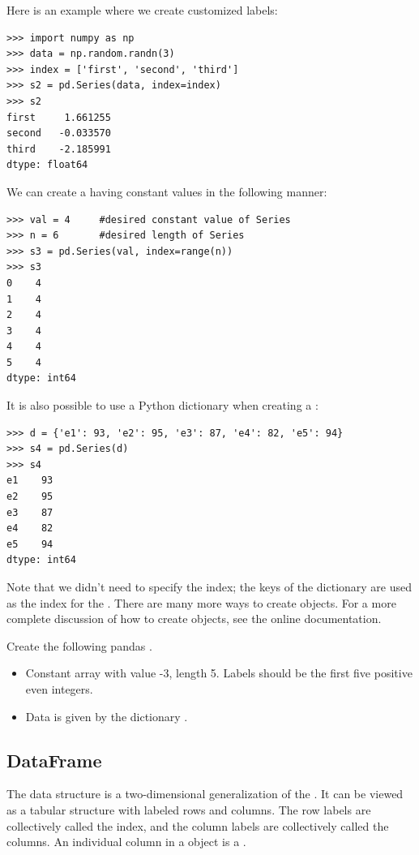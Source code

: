 Here is an example where we create customized labels:
\begin{lstlisting}
>>> import numpy as np
>>> data = np.random.randn(3)
>>> index = ['first', 'second', 'third']
>>> s2 = pd.Series(data, index=index)
>>> s2
first     1.661255
second   -0.033570
third    -2.185991
dtype: float64
\end{lstlisting}

We can create a  having constant values in the following manner:
\begin{lstlisting}
>>> val = 4     #desired constant value of Series
>>> n = 6       #desired length of Series
>>> s3 = pd.Series(val, index=range(n))
>>> s3
0    4
1    4
2    4
3    4
4    4
5    4
dtype: int64
\end{lstlisting}

It is also possible to use a Python dictionary when creating a :
\begin{lstlisting}
>>> d = {'e1': 93, 'e2': 95, 'e3': 87, 'e4': 82, 'e5': 94}
>>> s4 = pd.Series(d)
>>> s4
e1    93
e2    95
e3    87
e4    82
e5    94
dtype: int64
\end{lstlisting}
Note that we didn't need to specify the index; the keys of the dictionary are used as the index for the .
There are many more ways to create  objects.
For a more complete discussion of how to create  objects, see the online documentation.

\begin{problem}
Create the following pandas .

\begin{itemize}
\item Constant array with value -3, length 5. Labels should be the first five positive even integers.

\item Data is given by the dictionary .
\end{itemize}
\end{problem}

\subsection*{DataFrame}
The  data structure is a two-dimensional generalization of the . It can be viewed
as a tabular structure with labeled rows and columns. The row labels are collectively called the
index, and the column labels are collectively called the columns. An individual column in a
 object is a .

